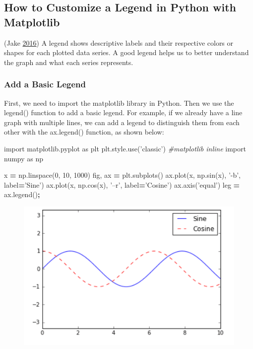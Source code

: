 \documentclass[]{book}
\newenvironment{Shaded}{\begin{snugshade}}{\end{snugshade}}
\newcommand{\DecValTok}[1]{\textcolor[rgb]{0.00,0.00,0.81}{#1}}
\newcommand{\StringTok}[1]{\textcolor[rgb]{0.31,0.60,0.02}{#1}}
\newcommand{\ImportTok}[1]{#1}
\newcommand{\CommentTok}[1]{\textcolor[rgb]{0.56,0.35,0.01}{\textit{#1}}}
\newcommand{\OperatorTok}[1]{\textcolor[rgb]{0.81,0.36,0.00}{\textbf{#1}}}
\newcommand{\NormalTok}[1]{#1}
\begin{document}
\subsection{How to Customize a Legend in Python with
Matplotlib}\label{how-to-customize-a-legend-in-python-with-matplotlib}

(Jake \protect\hyperlink{ref-PythonDataScienceHandbook}{2016}) A legend
shows descriptive labels and their respective colors or shapes for each
plotted data series. A good legend helps us to better understand the
graph and what each series represents.

\subsubsection{Add a Basic Legend}\label{add-a-basic-legend}

First, we need to import the matplotlib library in Python. Then we use
the legend() function to add a basic legend. For example, if we already
have a line graph with multiple lines, we can add a legend to
distinguish them from each other with the ax.legend() function, as shown
below:

\begin{Shaded}
\begin{Highlighting}[]
\ImportTok{import}\NormalTok{ matplotlib.pyplot }\ImportTok{as}\NormalTok{ plt}
\NormalTok{plt.style.use(}\StringTok{'classic'}\NormalTok{)}
\CommentTok{#matplotlib inline}
\ImportTok{import}\NormalTok{ numpy }\ImportTok{as}\NormalTok{ np}

\NormalTok{x }\OperatorTok{=}\NormalTok{ np.linspace(}\DecValTok{0}\NormalTok{, }\DecValTok{10}\NormalTok{, }\DecValTok{1000}\NormalTok{)}
\NormalTok{fig, ax }\OperatorTok{=}\NormalTok{ plt.subplots()}
\NormalTok{ax.plot(x, np.sin(x), }\StringTok{'-b'}\NormalTok{, label}\OperatorTok{=}\StringTok{'Sine'}\NormalTok{)}
\NormalTok{ax.plot(x, np.cos(x), }\StringTok{'--r'}\NormalTok{, label}\OperatorTok{=}\StringTok{'Cosine'}\NormalTok{)}
\NormalTok{ax.axis(}\StringTok{'equal'}\NormalTok{)}
\NormalTok{leg }\OperatorTok{=}\NormalTok{ ax.legend()}\OperatorTok{;}
\end{Highlighting}
\end{Shaded}

\begin{figure}
\centering
\includegraphics{images/legend1.png}
\caption{}
\end{figure}
\end{document}
